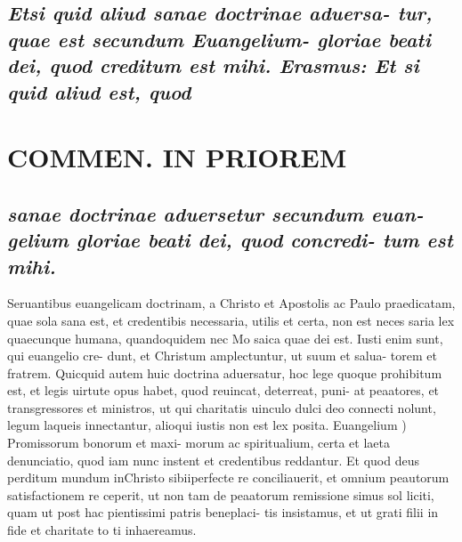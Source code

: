 \documentclass{article}
\begin{document}
\begin{pages}
\subsection*{\textit{Etsi quid aliud sanae doctrinae aduersa- tur, quae est secundum Euangelium- gloriae beati dei, quod creditum est mihi. Erasmus: Et si quid aliud est, quod }}
\section*{COMMEN. IN PRIOREM }
\marginpar{[ p.22 ]}
{}
\subsection*{\textit{sanae doctrinae aduersetur secundum euan- gelium gloriae beati dei, quod concredi- tum est mihi. }}\pstart Seruantibus euangelicam doctrinam, a Christo et Apostolis ac Paulo praedicatam, quae sola sana est, et credentibis necessaria, utilis et certa, non est neces saria lex quaecunque humana, quandoquidem nec Mo saica quae dei est. Iusti enim sunt, qui euangelio cre- dunt, et Christum amplectuntur, ut suum et salua- torem et fratrem. Quicquid autem huic doctrina aduersatur, hoc lege quoque prohibitum est, et legis uirtute opus habet, quod reuincat, deterreat, puni- at peaatores, et transgressores et ministros, ut qui charitatis uinculo dulci deo connecti nolunt, legum laqueis innectantur, alioqui iustis non est lex posita.  \pend\pstart Euangelium ) Promissorum bonorum et maxi- morum ac spiritualium, certa et laeta denunciatio, quod iam nunc instent et credentibus reddantur. Et quod deus perditum mundum inChristo sibiiperfecte re conciliauerit, et omnium peautorum satisfactionem re ceperit, ut non tam de peaatorum remissione simus sol liciti, quam ut post hac pientissimi patris beneplaci- tis insistamus, et ut grati filii in fide et charitate to ti inhaereamus.  \pend

\end{pages}
\end{document}
